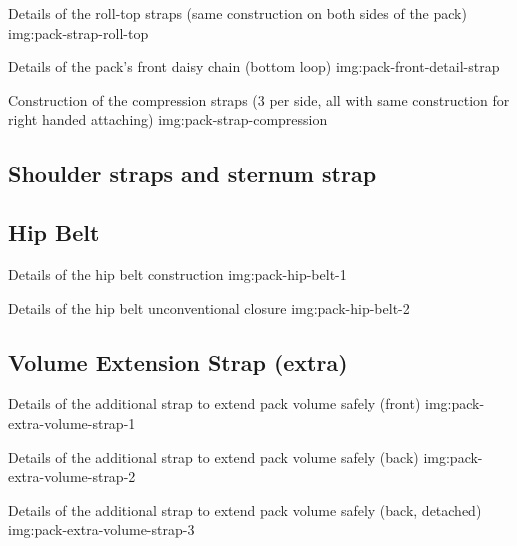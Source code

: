 {Details of the roll-top straps (same construction on both sides of the pack)}
{img:pack-strap-roll-top}

{Details of the pack's front daisy chain (bottom loop)}
{img:pack-front-detail-strap}

{Construction of the compression straps (3 per side, all with same construction for right handed attaching)}
{img:pack-strap-compression}

\subsection{Shoulder straps and sternum strap}

\subsection{Hip Belt}

{Details of the hip belt construction}
{img:pack-hip-belt-1}

{Details of the hip belt unconventional closure}
{img:pack-hip-belt-2}

\subsection{Volume Extension Strap (extra)}

{Details of the additional strap to extend pack volume safely (front)}
{img:pack-extra-volume-strap-1}

{Details of the additional strap to extend pack volume safely (back)}
{img:pack-extra-volume-strap-2}

{Details of the additional strap to extend pack volume safely (back, detached)}
{img:pack-extra-volume-strap-3}
